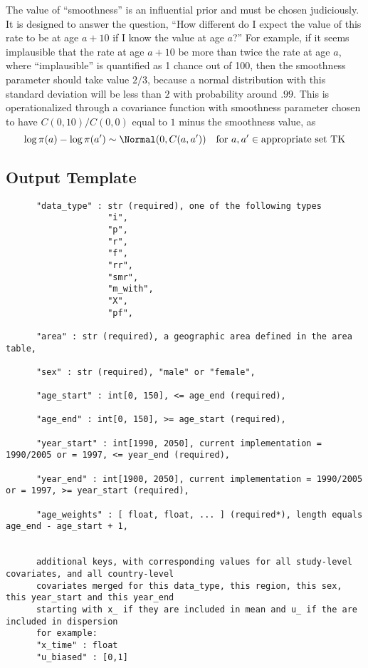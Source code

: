 The value of ``smoothness'' is an influential prior and must be chosen
judiciously.  It is designed to answer the question, ``How different
do I expect the value of this rate to be at age $a+10$ if I know the
value at age $a$?''  For example, if it seems implausible that the
rate at age $a+10$ be more than twice the rate at age $a$, where
``implausible'' is quantified as 1 chance out of 100, then the
smoothness parameter should take value $2/3$, because a normal
distribution with this standard deviation will be less than $2$ with
probability around $.99$.  This is operationalized through a \Matern
covariance function with smoothness parameter chosen to have $C(0,
10) / C(0,0)$ equal to $1$ minus the smoothness value, as
\[
\log \pi(a) - \log \pi(a') \sim \Normal(0, C(a, a')) \quad \text{for } a, a' \in \text{appropriate set TK}
\]

\subsection{Output Template}
\begin{verbatim}
      "data_type" : str (required), one of the following types
                    "i",
                    "p",
                    "r",
                    "f",
                    "rr",
                    "smr",
                    "m_with",
                    "X",
                    "pf", 

      "area" : str (required), a geographic area defined in the area table,

      "sex" : str (required), "male" or "female",

      "age_start" : int[0, 150], <= age_end (required),

      "age_end" : int[0, 150], >= age_start (required),

      "year_start" : int[1990, 2050], current implementation = 1990/2005 or = 1997, <= year_end (required),

      "year_end" : int[1900, 2050], current implementation = 1990/2005 or = 1997, >= year_start (required),

      "age_weights" : [ float, float, ... ] (required*), length equals age_end - age_start + 1,


      additional keys, with corresponding values for all study-level covariates, and all country-level   
      covariates merged for this data_type, this region, this sex, this year_start and this year_end
      starting with x_ if they are included in mean and u_ if the are included in dispersion
      for example:
      "x_time" : float
      "u_biased" : [0,1]
\end{verbatim}

